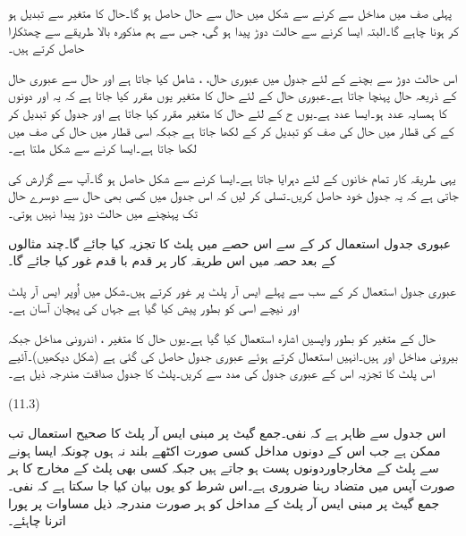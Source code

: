 پہلی صف میں مداخل  سے   کرنے سے شکل   میں حال   سے حال  حاصل   ہو گا۔حال کا متغیر   سے تبدیل ہو کر  ہونا چاہے گا۔البتہ ایسا کرنے سے حالت دوڑ پیدا ہو گی، جس سے ہم  مذکورہ بالا  طریقے سے چھٹکارا حاصل کرتے ہیں۔

اس  حالت دوڑ سے  بچنے کے لئے  جدول میں عبوری حال،  ، شامل کیا جاتا ہے  اور   حال   سے عبوری حال   کے ذریعہ حال    پہنچا جاتا ہے۔عبوری حال    کے  لئے حال کا متغیر یوں مقرر کیا جاتا ہے کہ یہ   اور     دونوں کا ہمسایہ عدد ہو۔ایسا عدد   ہے۔یوں ح   کے لئے حال  کا متغیر   مقرر کیا جاتا ہے اور جدول کو تبدیل کر کے   کی قطار   میں  حال  کی صف    کو تبدیل کر کے  لکھا جاتا ہے جبکہ اسی قطار میں حال  کی صف میں   لکھا جاتا ہے۔ایسا کرنے سے شکل     ملتا ہے۔

یہی طریقہ کار تمام خانوں کے لئے دہرایا جاتا ہے۔ایسا کرنے سے شکل   حاصل ہو گا۔آپ سے  گزارش کی جاتی ہے کہ   یہ جدول خود حاصل کریں۔تسلی کر لیں کہ اس جدول میں کسی بھی حال سے دوسرے حال تک پہنچنے میں حالت دوڑ پیدا نہیں ہوتی۔


عبوری جدول  استعمال  کر کے سے اس حصے  میں پلٹ کا تجزیہ کیا جائے گا۔چند مثالوں کے بعد حصہ  میں اس طریقہ کار پر قدم با قدم غور کیا  جائے گا۔

عبوری جدول استعمال  کر کے سب سے پہلے ایس آر پلٹ پر غور کرتے ہیں۔شکل   میں اُوپر  ایس آر پلٹ  اور نیچے اسی کو بطور  پیش کیا گیا ہے جہاں  کی پہچان آسان  ہے۔

 حال کے  متغیر   کو بطور واپسیں اشارہ   استعمال کیا گیا ہے۔یوں حال کا متغیر ، اندرونی مداخل   جبکہ بیرونی مداخل   اور  ہیں۔انہیں استعمال کرتے ہوئے عبوری جدول حاصل کی گئی ہے (شکل   دیکھیں)۔آئیے اس پلٹ کا تجزیہ اس کے عبوری جدول کی مدد سے کریں۔پلٹ کا جدول    صداقت مندرجہ ذیل ہے۔
 
(11.3)

	اس جدول سے ظاہر ہے کہ نفی۔جمع گیٹ پر مبنی ایس آر پلٹ کا صحیح استعمال تب ممکن ہے جب اس کے دونوں مداخل کسی صورت اکٹھے بلند نہ ہوں چونکہ ایسا ہونے سے پلٹ کے مخارجاوردونوں پست ہو جاتے ہیں جبکہ کسی بھی پلٹ کے مخارج کا ہر صورت آپس میں متضاد رہنا ضروری ہے۔اس شرط کو یوں بیان کیا جا سکتا ہے کہ نفی۔جمع گیٹ پر مبنی ایس آر پلٹ کے مداخل کو ہر صورت مندرجہ ذیل مساوات پر پورا اترنا چاہئے۔

